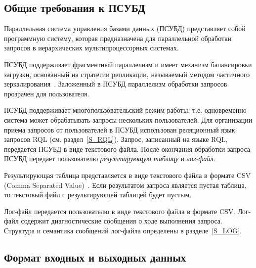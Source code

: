 \documentclass[11pt,oneside]{article}
\begin{document}
	\subsection{Общие требования к ПСУБД}\label{S_PDBMSRequirements}
	\par Параллельная система управления базами данных (ПСУБД) представляет собой программную систему, которая предназначена для параллельной обработки запросов в иерархических мультипроцессорных системах.
	
	\par ПСУБД поддерживает фрагментный параллелизм и имеет механизм балансировки загрузки, основанный на стратегии репликации, называемый методом частичного зеркалирования~\cite{B_Lepikhov2006}. Заложенный в ПСУБД параллелизм обработки запросов прозрачен для пользователя.
	
	\par ПСУБД поддерживает многопользовательский режим работы, т.е. одновременно система может обрабатывать запросы нескольких пользователей.
	Для организации приема запросов от пользователей в ПСУБД использован реляционный язык запросов RQL (см. раздел~\ref{S_RQL}). Запрос, записанный на языке RQL, передается ПСУБД в виде текстового файла. После окончания обработки запроса ПСУБД передает пользователю \textit{результирующую таблицу} и \textit{лог-файл}.
	
	\par Результирующая таблица представляется в виде текстового файла в формате CSV (Comma Separated Value)~\cite{B_RFC4180}. Если результатом запроса является пустая таблица, то текстовый файл с результирующей таблицей будет пустым.
	\par Лог-файл передается пользователю в виде текстового файла в формате CSV. Лог-файл содержит диагностические сообщения о ходе выполнения запроса. Структура и семантика сообщений лог-файла определены в разделе~\ref{S_LOG}.
	
	\subsection{Формат входных и выходных данных}\label{S_InOutData}
\end{document}

